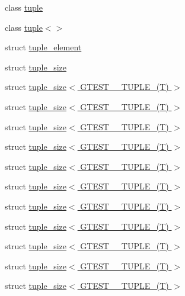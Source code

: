 \begin{DoxyCompactItemize}
\item 
class \hyperlink{classstd_1_1tr1_1_1tuple}{tuple}
\item 
class \hyperlink{classstd_1_1tr1_1_1tuple_3_4}{tuple$<$$>$}
\item 
struct \hyperlink{structstd_1_1tr1_1_1tuple__element}{tuple\+\_\+element}
\item 
struct \hyperlink{structstd_1_1tr1_1_1tuple__size}{tuple\+\_\+size}
\item 
struct \hyperlink{structstd_1_1tr1_1_1tuple__size_3_01GTEST__0__TUPLE___07T_08_01_4}{tuple\+\_\+size$<$ G\+T\+E\+S\+T\+\_\+\_\+\+T\+U\+P\+L\+E\+\_\+(\+T) $>$}
\item 
struct \hyperlink{structstd_1_1tr1_1_1tuple__size_3_01GTEST__10__TUPLE___07T_08_01_4}{tuple\+\_\+size$<$ G\+T\+E\+S\+T\+\_\+\_\+\+T\+U\+P\+L\+E\+\_\+(\+T) $>$}
\item 
struct \hyperlink{structstd_1_1tr1_1_1tuple__size_3_01GTEST__1__TUPLE___07T_08_01_4}{tuple\+\_\+size$<$ G\+T\+E\+S\+T\+\_\+\_\+\+T\+U\+P\+L\+E\+\_\+(\+T) $>$}
\item 
struct \hyperlink{structstd_1_1tr1_1_1tuple__size_3_01GTEST__2__TUPLE___07T_08_01_4}{tuple\+\_\+size$<$ G\+T\+E\+S\+T\+\_\+\_\+\+T\+U\+P\+L\+E\+\_\+(\+T) $>$}
\item 
struct \hyperlink{structstd_1_1tr1_1_1tuple__size_3_01GTEST__3__TUPLE___07T_08_01_4}{tuple\+\_\+size$<$ G\+T\+E\+S\+T\+\_\+\_\+\+T\+U\+P\+L\+E\+\_\+(\+T) $>$}
\item 
struct \hyperlink{structstd_1_1tr1_1_1tuple__size_3_01GTEST__4__TUPLE___07T_08_01_4}{tuple\+\_\+size$<$ G\+T\+E\+S\+T\+\_\+\_\+\+T\+U\+P\+L\+E\+\_\+(\+T) $>$}
\item 
struct \hyperlink{structstd_1_1tr1_1_1tuple__size_3_01GTEST__5__TUPLE___07T_08_01_4}{tuple\+\_\+size$<$ G\+T\+E\+S\+T\+\_\+\_\+\+T\+U\+P\+L\+E\+\_\+(\+T) $>$}
\item 
struct \hyperlink{structstd_1_1tr1_1_1tuple__size_3_01GTEST__6__TUPLE___07T_08_01_4}{tuple\+\_\+size$<$ G\+T\+E\+S\+T\+\_\+\_\+\+T\+U\+P\+L\+E\+\_\+(\+T) $>$}
\item 
struct \hyperlink{structstd_1_1tr1_1_1tuple__size_3_01GTEST__7__TUPLE___07T_08_01_4}{tuple\+\_\+size$<$ G\+T\+E\+S\+T\+\_\+\_\+\+T\+U\+P\+L\+E\+\_\+(\+T) $>$}
\item 
struct \hyperlink{structstd_1_1tr1_1_1tuple__size_3_01GTEST__8__TUPLE___07T_08_01_4}{tuple\+\_\+size$<$ G\+T\+E\+S\+T\+\_\+\_\+\+T\+U\+P\+L\+E\+\_\+(\+T) $>$}
\item 
struct \hyperlink{structstd_1_1tr1_1_1tuple__size_3_01GTEST__9__TUPLE___07T_08_01_4}{tuple\+\_\+size$<$ G\+T\+E\+S\+T\+\_\+\_\+\+T\+U\+P\+L\+E\+\_\+(\+T) $>$}
\end{DoxyCompactItemize}
